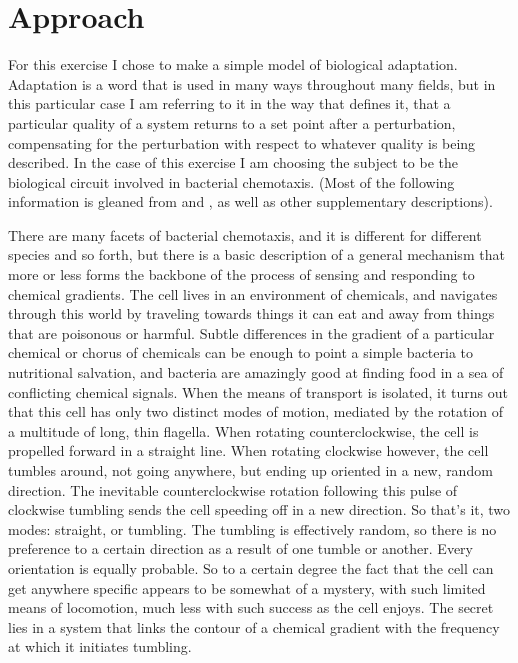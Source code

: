 \documentclass[12pt]{article}
\begin{document}
\maketitle

\section{Approach}

For this exercise I chose to make a simple model of biological adaptation.  Adaptation is a word that is used in many ways throughout many fields, but in this particular case I am referring to it in the way that \cite{Alon} defines it, that a particular quality of a system returns to a set point after a perturbation, compensating for the perturbation with respect to whatever quality is being described.  In the case of this exercise I am choosing the subject to be the biological circuit involved in bacterial chemotaxis.   (Most of the following information is gleaned from \cite{Alon} and \cite{Fall}, as well as other supplementary descriptions).  

There are many facets of bacterial chemotaxis, and it is different for different species and so forth, but there is a basic description of a general mechanism that more or less forms the backbone of the process of sensing and responding to chemical gradients.  The cell lives in an environment of chemicals, and navigates through this world by traveling towards things it can eat and away from things that are poisonous or harmful.  Subtle differences in the gradient of a particular chemical or chorus of chemicals can be enough to point a simple bacteria to nutritional salvation, and bacteria are amazingly good at finding food in a sea of conflicting chemical signals.  When the means of transport is isolated, it turns out that this cell has only two distinct modes of motion, mediated by the rotation of a multitude of long, thin flagella.  When rotating counterclockwise, the cell is propelled forward in a straight line.  When rotating clockwise however, the cell tumbles around, not going anywhere, but ending up oriented in a new, random direction.  The inevitable counterclockwise rotation following this pulse of clockwise tumbling sends the cell speeding off in a new direction.  So that's it, two modes: straight, or tumbling.  The tumbling is effectively random, so there is no preference to a certain direction as a result of one tumble or another.  Every orientation is equally probable.  So to a certain degree the fact that the cell can get anywhere specific appears to be somewhat of a mystery, with such limited means of locomotion, much less with such success as the cell enjoys.  The secret lies in a system that links the contour of a chemical gradient with the frequency at which it initiates tumbling.  
\end{document}
